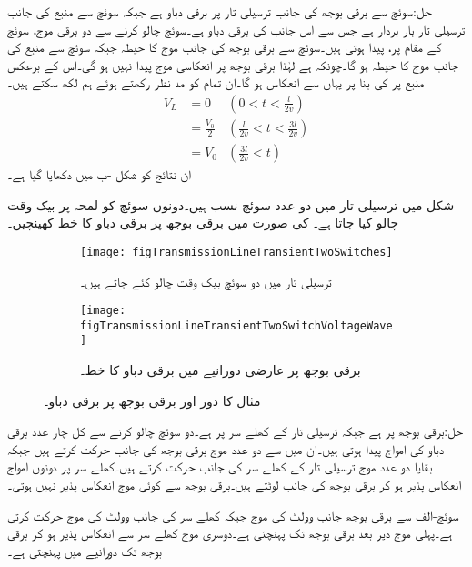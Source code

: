 حل:سوئچ سے برقی بوجھ کی جانب ترسیلی تار پر  برقی دباو ہے جبکہ سوئچ سے منبع کی جانب ترسیلی تار بار بردار ہے جس سے اس جانب کی برقی دباو  ہے۔سوئچ چالو کرنے سے  دو برقی موج، سوئچ کے مقام پر،  پیدا ہوتی ہیں۔سوئچ سے برقی بوجھ  کی جانب موج کا حیطہ  جبکہ سوئچ سے منبع کی جانب موج کا حیطہ  ہو گا۔چونکہ  ہے لہٰذا برقی بوجھ پر انعکاسی موج پیدا نہیں ہو گی۔اس کے برعکس منبع پر  کی بنا پر یہاں سے انعکاس ہو گا۔ان تمام کو مد نظر رکھتے ہوئے ہم لکھ سکتے ہیں۔
\begin{align*}
V_L&=0  &(0<t<\tfrac{l}{2v})\\
&=\frac{V_0}{2} & (\tfrac{l}{2v} < t < \tfrac{3l}{2v})\\
&=V_0 & (\tfrac{3l}{2v} < t  )
\end{align*}
ان نتائج کو شکل -ب میں دکھایا گیا ہے۔

شکل  میں ترسیلی تار میں دو عدد سوئچ نسب ہیں۔دونوں سوئچ کو لمحہ  پر بیک وقت چالو کیا جاتا ہے۔ کی صورت میں برقی بوجھ پر برقی دباو کا خط کھینچیں۔
\begin{figure}
\centering
\begin{subfigure}{0.8\textwidth}
\centering
\texttt{[image: figTransmissionLineTransientTwoSwitches]}
\caption{ترسیلی تار میں دو سوئچ بیک وقت چالو کئے جاتے ہیں۔}
\end{subfigure}

\begin{subfigure}{0.8\textwidth}
\centering
\texttt{[image: figTransmissionLineTransientTwoSwitchVoltageWave]}
\caption{برقی بوجھ پر عارضی دورانیے  میں برقی دباو کا خط۔}
\end{subfigure}
\caption{مثال  کا دور اور برقی بوجھ پر برقی دباو۔}
\label{شکل_ترسیلی_مثال_دو_سوئچ}
\end{figure}

حل:برقی بوجھ پر  ہے جبکہ ترسیلی تار کے کھلے سر پر  ہے۔دو سوئچ چالو کرنے سے کل چار عدد برقی دباو کی امواج پیدا ہوتی ہیں۔ان میں سے دو عدد موج برقی بوجھ کی جانب حرکت کرتے ہیں جبکہ بقایا دو عدد موج ترسیلی تار کے کھلے سر کی جانب حرکت کرتے ہیں۔کھلے سر پر دونوں امواج انعکاس پذیر ہو کر برقی بوجھ کی جانب لوٹتے ہیں۔برقی بوجھ سے کوئی موج انعکاس پذیر نہیں ہوتی۔

سوئچ-الف سے  برقی بوجھ جانب  وولٹ کی موج جبکہ کھلے سر کی جانب  وولٹ کی موج حرکت کرتی ہے۔پہلی موج  دیر بعد برقی بوجھ تک پہنچتی ہے۔دوسری موج کھلے سر سے انعکاس پذیر ہو کر برقی بوجھ تک  دورانیے میں پہنچتی ہے۔

